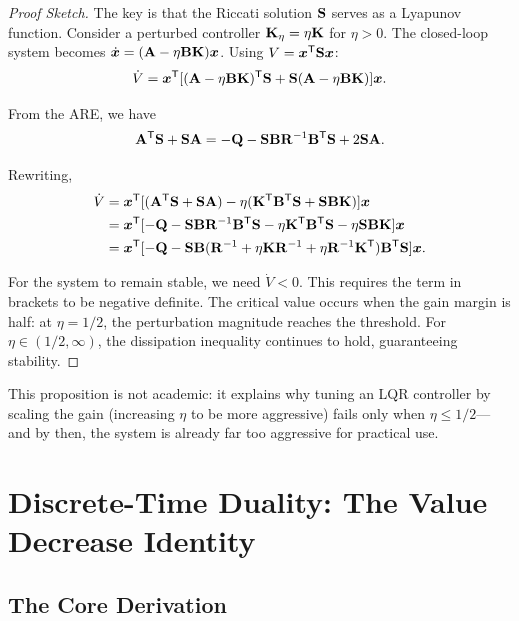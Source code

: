 \begin{proof}[Proof Sketch]
The key is that the Riccati solution $\mathbf{S}$ serves as a Lyapunov function. Consider a perturbed controller
$\mathbf{K}_\eta = \eta \mathbf{K}$ for $\eta > 0$. The closed-loop system becomes $\dot{\bm{x}} = (\mathbf{A} - \eta\mathbf{B}\mathbf{K})\bm{x}$.
Using $V = \bm{x}^{\mathsf{T}}\mathbf{S}\bm{x}$:
\begin{equation}
\dot{V} = \bm{x}^{\mathsf{T}}[(\mathbf{A} - \eta\mathbf{B}\mathbf{K})^{\mathsf{T}}\mathbf{S} + \mathbf{S}(\mathbf{A} - \eta\mathbf{B}\mathbf{K})]\bm{x}.
\label{eq:ch6:perturbed-V}
\end{equation}

From the ARE, we have
\begin{equation}
\mathbf{A}^{\mathsf{T}}\mathbf{S} + \mathbf{S}\mathbf{A} = -\mathbf{Q} - \mathbf{S}\mathbf{B}\mathbf{R}^{-1}\mathbf{B}^{\mathsf{T}}\mathbf{S} + 2\mathbf{S}\mathbf{A}.
\label{eq:ch6:are-rearrange}
\end{equation}

Rewriting,
\begin{align}
\dot{V} &= \bm{x}^{\mathsf{T}}[(\mathbf{A}^{\mathsf{T}}\mathbf{S} + \mathbf{S}\mathbf{A}) - \eta(\mathbf{K}^{\mathsf{T}}\mathbf{B}^{\mathsf{T}}\mathbf{S} + \mathbf{S}\mathbf{B}\mathbf{K})]\bm{x} \notag\\
&= \bm{x}^{\mathsf{T}}[-\mathbf{Q} - \mathbf{S}\mathbf{B}\mathbf{R}^{-1}\mathbf{B}^{\mathsf{T}}\mathbf{S}
  - \eta\mathbf{K}^{\mathsf{T}}\mathbf{B}^{\mathsf{T}}\mathbf{S} - \eta\mathbf{S}\mathbf{B}\mathbf{K}]\bm{x} \notag\\
&= \bm{x}^{\mathsf{T}}[-\mathbf{Q} - \mathbf{S}\mathbf{B}(\mathbf{R}^{-1} + \eta\mathbf{K}\mathbf{R}^{-1} + \eta\mathbf{R}^{-1}\mathbf{K}^{\mathsf{T}})\mathbf{B}^{\mathsf{T}}\mathbf{S}]\bm{x}.
\label{eq:ch6:eta-perturbation}
\end{align}

For the system to remain stable, we need $\dot{V} < 0$. This requires the term in brackets to be negative definite.
The critical value occurs when the gain margin is half: at $\eta = 1/2$, the perturbation magnitude reaches the
threshold. For $\eta \in (1/2, \infty)$, the dissipation inequality continues to hold, guaranteeing stability.
\end{proof}

This proposition is not academic: it explains why tuning an LQR controller by scaling the gain (increasing $\eta$ to be
more aggressive) fails only when $\eta \leq 1/2$—and by then, the system is already far too aggressive for practical use.

\section{Discrete-Time Duality: The Value Decrease Identity}

\subsection{The Core Derivation}

